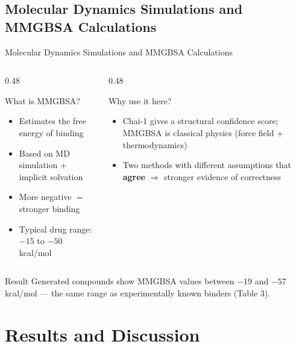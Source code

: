 \documentclass{beamer}
\begin{document}
\subsection{Molecular Dynamics Simulations and MMGBSA Calculations}

\begin{frame}{Molecular Dynamics Simulations and MMGBSA Calculations}
  \begin{columns}[T]
    \begin{column}{0.48\textwidth}
      \begin{block}{What is MMGBSA?}
        \begin{itemize}
          \item Estimates the free energy of binding
          \item Based on MD simulation + implicit solvation
          \item More negative $=$ stronger binding
          \item Typical drug range: $-15$ to $-50$ kcal/mol
        \end{itemize}
      \end{block}
    \end{column}
    \begin{column}{0.48\textwidth}
      \begin{block}{Why use it here?}
        \begin{itemize}
          \item Chai-1 gives a structural confidence score; MMGBSA is classical physics (force field + thermodynamics)
          \item Two methods with different assumptions that \textbf{agree} $\Rightarrow$ stronger evidence of correctness
        \end{itemize}
      \end{block}
    \end{column}
  \end{columns}

  \vspace{0.6em}
  \begin{alertblock}{Result}
    Generated compounds show MMGBSA values between $-19$ and $-57$ kcal/mol --- the same range as experimentally known binders (Table 3).
  \end{alertblock}
\end{frame}

\section{Results and Discussion}
\end{document}
